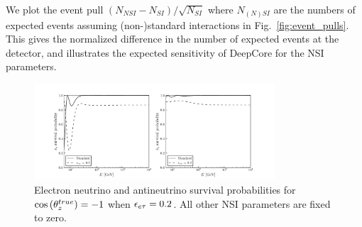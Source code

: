 We plot the event pull $(N_{NSI} - N_{SI})/\sqrt{N_{SI}}$ where $N_{(N)SI}$ are the numbers of expected events
assuming (non-)standard interactions in Fig.~\ref{fig:event_pulls}. This gives the normalized difference in the
number of expected events at the detector, and illustrates the expected sensitivity of DeepCore for the NSI parameters.
\begin{figure}
    \begin{center}
        \includegraphics[width=0.8\textwidth]{figures/Pee_eet_probs.pdf}
        \caption{Electron neutrino and antineutrino survival probabilities for
        $\cos{(\theta_z^{true})} = -1$ when $\epsilon_{e\tau} = 0.2$. All other NSI parameters are fixed to zero.}
        \label{fig:Pee_eet_probs}
    \end{center}
\end{figure}


